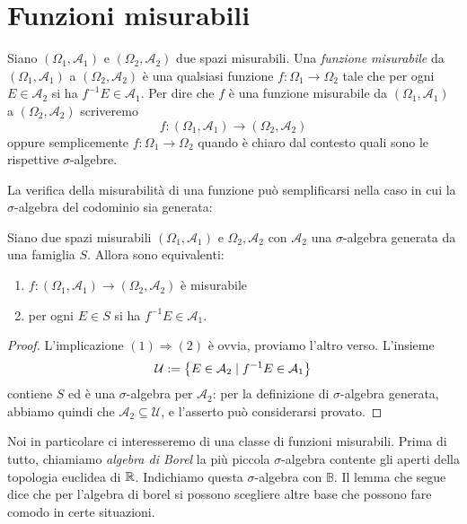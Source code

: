 
\section{Funzioni misurabili}

\begin{definizione}
Siano \((\Omega_1, \mathcal A_1)\) e \((\Omega_2, \mathcal A_2)\) due spazi misurabili. Una {\em funzione misurabile} da \((\Omega_1, \mathcal A_1)\) a \((\Omega_2, \mathcal A_2)\) è una qualsiasi funzione \(f : \Omega_1 \to \Omega_2\) tale che per ogni \(E \in \mathcal A_2\) si ha \(f^{-1} E \in \mathcal A_1\). Per dire che \(f\) è una funzione misurabile da \((\Omega_1, \mathcal A_1)\) a \((\Omega_2, \mathcal A_2)\) scriveremo
\[f : (\Omega_1, \mathcal A_1) \to (\Omega_2, \mathcal A_2)\]
oppure semplicemente \(f : \Omega_1 \to \Omega_2\) quando è chiaro dal contesto quali sono le rispettive \(\sigma\)-algebre.
\end{definizione}

La verifica della misurabilità di una funzione può semplificarsi  nella caso in cui la \(\sigma\)-algebra del codominio sia generata:

\begin{lemma}
Siano due spazi misurabili \((\Omega_1, \mathcal A_1)\) e \(\Omega_2, \mathcal A_2\) con \(\mathcal A_2\) una \(\sigma\)-algebra generata da una famiglia \(S\). Allora sono equivalenti:
\begin{enumerate}
\item \(f : (\Omega_1, \mathcal A_1) \to (\Omega_2, \mathcal A_2)\) è misurabile
\item per ogni \(E \in S\) si ha \(f^{-1} E \in \mathcal A_1\).
\end{enumerate}
\end{lemma}

\begin{proof}
L'implicazione \((1) \Rightarrow (2)\) è ovvia, proviamo l'altro verso. L'insieme
\[\mathcal U := \left\{E \in \mathcal A_2 \mid f^{-1}E \in \mathcal A_1\right\}\]
contiene \(S\) ed è una \(\sigma\)-algebra per \(\mathcal A_2\): per la definizione di \(\sigma\)-algebra generata, abbiamo quindi che \(\mathcal A_2 \subseteq \mathcal U\), e l'asserto può considerarsi provato.
\end{proof}

Noi in particolare ci interesseremo di una classe di funzioni misurabili. Prima di tutto, chiamiamo {\em algebra di Borel} la più piccola \(\sigma\)-algebra contente gli aperti della topologia euclidea di \(\mathbb R\). Indichiamo questa \(\sigma\)-algebra con \(\mathbb B\). Il lemma che segue dice che per l'algebra di borel si possono scegliere altre base che possono fare comodo in certe situazioni.

